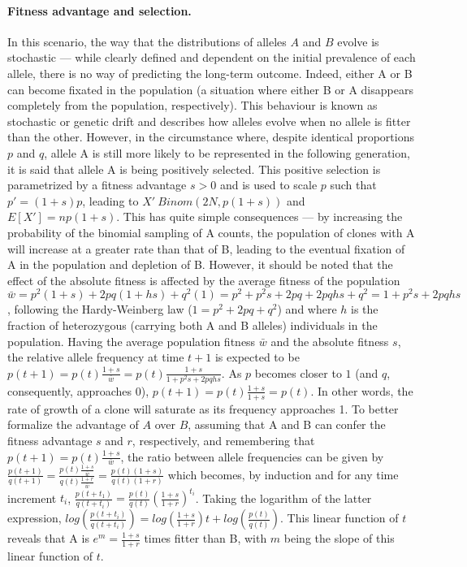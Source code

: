 \paragraph{Fitness advantage and selection.} In this scenario, the way that the distributions of alleles $A$ and $B$ evolve is stochastic --- while clearly defined and dependent on the initial prevalence of each allele, there is no way of predicting the long-term outcome. Indeed, either A or B can become fixated in the population (a situation where either B or A disappears completely from the population, respectively). This behaviour is known as stochastic or genetic drift and describes how alleles evolve when no allele is fitter than the other. However, in the circumstance where, despite identical proportions $p$ and $q$, allele A is still more likely to be represented in the following generation, it is said that allele A is being positively selected. This positive selection is parametrized by a fitness advantage $s > 0$ and is used to scale $p$ such that $p' = (1+s)p$, leading to $X' ~ Binom(2N,p(1+s))$ and $E[X'] = np(1+s)$. This has quite simple consequences --- by increasing the probability of the binomial sampling of A counts, the population of clones with A will increase at a greater rate than that of B, leading to the eventual fixation of A in the population and depletion of B. However, it should be noted that the effect of the absolute fitness is affected by the average fitness of the population $\bar{w} = p^2(1+s) + 2pq(1+hs) + q^2(1) = p^2 + p^2s + 2pq + 2pqhs + q^2 = 1 + p^2s + 2pqhs$, following the Hardy-Weinberg law ($1 = p^2 + 2pq + q^2$) and where $h$ is the fraction of heterozygous (carrying both A and B alleles) individuals in the population. Having the average population fitness $\bar{w}$ and the absolute fitness $s$, the relative allele frequency at time $t+1$ is expected to be $p(t+1) = p(t)\frac{1+s}{\bar{w}} = p(t)\frac{1+s}{1 + p^2s + 2pqhs}$. As $p$ becomes closer to $1$ (and $q$, consequently, approaches $0$), $p(t+1) = p(t)\frac{1+s}{1+s} = p(t)$. In other words, the rate of growth of a clone will saturate as its frequency approaches 1. To better formalize the advantage of $A$ over $B$, assuming that A and B can confer the fitness advantage $s$ and $r$, respectively, and remembering that $p(t+1) = p(t)\frac{1+s}{\bar{w}}$, the ratio between allele frequencies can be given by $\frac{p(t+1)}{q(t+1)} = \frac{p(t)\frac{1+s}{\bar{w}}}{q(t)\frac{1+r}{\bar{w}}} = \frac{p(t)(1+s)}{q(t)(1+r)}$ which becomes, by induction and for any time increment $t_i$, $\frac{p(t+t_1)}{q(t+t_i)}=\frac{p(t)}{q(t)}(\frac{1+s}{1+r})^{t_i}$. Taking the logarithm of the latter expression, $log(\frac{p(t+t_i)}{q(t+t_i)}) = log(\frac{1+s}{1+r})t + log(\frac{p(t)}{q(t)})$. This linear function of $t$ reveals that A is $e^{m} = \frac{1+s}{1+r}$ times fitter than B, with $m$ being the slope of this linear function of $t$. 
